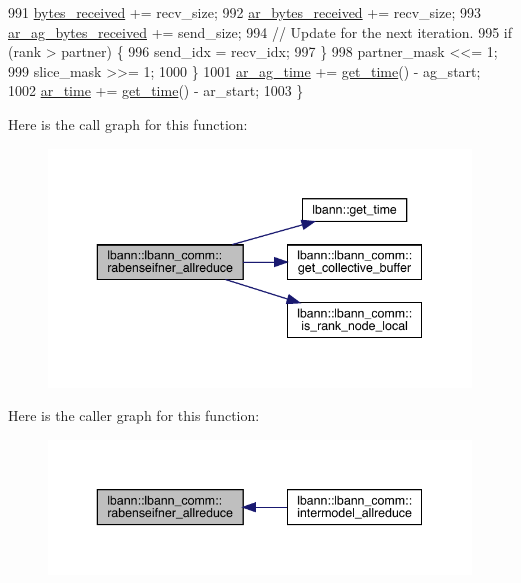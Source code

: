 \begin{DoxyCode}
991     \hyperlink{classlbann_1_1lbann__comm_afb99f57f7eafc0695bf28e6c26a8120f}{bytes\_received} += recv\_size;
992     \hyperlink{classlbann_1_1lbann__comm_aa5f3c53358bf9002b9fab41918b0c8c1}{ar\_bytes\_received} += recv\_size;
993     \hyperlink{classlbann_1_1lbann__comm_afded6f478dc5021d1edec306dc6c528c}{ar\_ag\_bytes\_received} += send\_size;
994     \textcolor{comment}{// Update for the next iteration.}
995     \textcolor{keywordflow}{if} (rank > partner) \{
996       send\_idx = recv\_idx;
997     \}
998     partner\_mask <<= 1;
999     slice\_mask >>= 1;
1000   \}
1001   \hyperlink{classlbann_1_1lbann__comm_a48768342eb05c1c6cdaa52c3599b93c8}{ar\_ag\_time} += \hyperlink{namespacelbann_a478d36031ff0659893c4322cd856157f}{get\_time}() - ag\_start;
1002   \hyperlink{classlbann_1_1lbann__comm_aa57d2fbeef85fd8a3c9f2a37ca7687c8}{ar\_time} += \hyperlink{namespacelbann_a478d36031ff0659893c4322cd856157f}{get\_time}() - ar\_start;
1003 \}
\end{DoxyCode}
Here is the call graph for this function\+:\nopagebreak
\begin{figure}[H]
\begin{center}
\leavevmode
\includegraphics[width=343pt]{classlbann_1_1lbann__comm_a925fcf1c15cb8ff10daed1dc1faed9ac_cgraph}
\end{center}
\end{figure}
Here is the caller graph for this function\+:\nopagebreak
\begin{figure}[H]
\begin{center}
\leavevmode
\includegraphics[width=343pt]{classlbann_1_1lbann__comm_a925fcf1c15cb8ff10daed1dc1faed9ac_icgraph}
\end{center}
\end{figure}
\mbox{\label{classlbann_1_1lbann__comm_a99bc2f8128f0b0e2ebdf876a3a343635}} 
